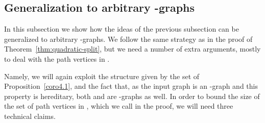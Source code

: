 \documentclass[
final
]{dmtcs-episciences}
\begin{document}
\subsection{Generalization to arbitrary -graphs}
\label{subsec:quadratic-general}

In this subsection we show how the ideas of the previous subsection can be generalized to arbitrary -graphs. We follow the same strategy as in the proof of Theorem~\ref{thm:quadratic-split}, but we need a number of extra arguments, mostly to deal with the path vertices in .

Namely, we will again exploit the structure given by the set  of Proposition~\ref{coro4.1}, and the fact that, as  the input graph is an -graph and this property is hereditary, both  and  are -graphs as well. In order to bound the size of the set of path vertices in , which we call  in the proof, we will need three technical claims.
\end{document}
